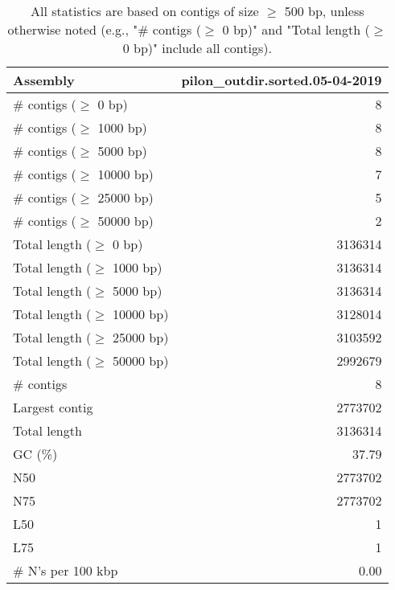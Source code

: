 \documentclass[12pt,a4paper]{article}
\begin{document}
\begin{table}[ht]
\begin{center}
\caption{All statistics are based on contigs of size $\geq$ 500 bp, unless otherwise noted (e.g., "\# contigs ($\geq$ 0 bp)" and "Total length ($\geq$ 0 bp)" include all contigs).}
\begin{tabular}{|l*{1}{|r}|}
\hline
Assembly & pilon\_outdir.sorted.05-04-2019 \\ \hline
\# contigs ($\geq$ 0 bp) & 8 \\ \hline
\# contigs ($\geq$ 1000 bp) & 8 \\ \hline
\# contigs ($\geq$ 5000 bp) & 8 \\ \hline
\# contigs ($\geq$ 10000 bp) & 7 \\ \hline
\# contigs ($\geq$ 25000 bp) & 5 \\ \hline
\# contigs ($\geq$ 50000 bp) & 2 \\ \hline
Total length ($\geq$ 0 bp) & 3136314 \\ \hline
Total length ($\geq$ 1000 bp) & 3136314 \\ \hline
Total length ($\geq$ 5000 bp) & 3136314 \\ \hline
Total length ($\geq$ 10000 bp) & 3128014 \\ \hline
Total length ($\geq$ 25000 bp) & 3103592 \\ \hline
Total length ($\geq$ 50000 bp) & 2992679 \\ \hline
\# contigs & 8 \\ \hline
Largest contig & 2773702 \\ \hline
Total length & 3136314 \\ \hline
GC (\%) & 37.79 \\ \hline
N50 & 2773702 \\ \hline
N75 & 2773702 \\ \hline
L50 & 1 \\ \hline
L75 & 1 \\ \hline
\# N's per 100 kbp & 0.00 \\ \hline
\end{tabular}
\end{center}
\end{table}
\end{document}
